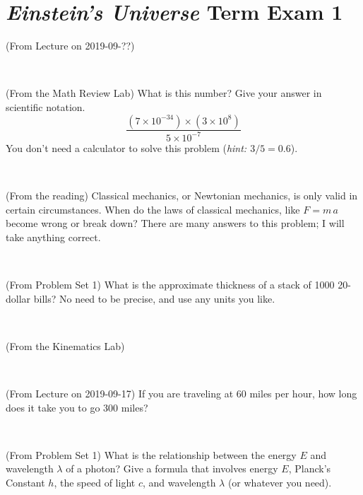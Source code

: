\documentclass[12pt, letterpaper]{article}
\begin{document}
\section*{\textsl{Einstein's Universe} Term Exam 1}
\setcounter{problem}{1}


\begin{problem} (From Lecture on 2019-09-??)
\end{problem}


\vfill ~

\begin{problem} (From the Math Review Lab)
What is this number? Give your answer in scientific notation.
$$
\frac{(7\times10^{-34})\times(3\times10^8)}{5\times10^{-7}}
$$
You don't need a calculator to solve this problem (\textit{hint: $3/5=0.6$}).
\end{problem}


\vfill ~

\begin{problem} (From the reading)
Classical mechanics, or Newtonian mechanics, is only valid in certain
circumstances. When do the laws of classical mechanics, like $F =
m\,a$ become wrong or break down? There are many answers to this
problem; I will take anything correct.
\end{problem}


\vfill ~

\begin{problem} (From Problem Set 1)
What is the approximate thickness of a stack of 1000 20-dollar bills?
No need to be precise, and use any units you like.
\end{problem}


\vfill ~


\clearpage


\begin{problem} (From the Kinematics Lab)

\end{problem}


\vfill ~

\begin{problem} (From Lecture on 2019-09-17)
If you are traveling at 60 miles per hour, how long does
it take you to go 300 miles?
\end{problem}


\vfill ~

\begin{problem} (From Problem Set 1)
What is the relationship between the energy $E$ and wavelength
$\lambda$ of a photon? Give a formula that involves energy $E$,
Planck's Constant $h$, the speed of light $c$, and wavelength
$\lambda$ (or whatever you need).
\end{problem}
\end{document}
